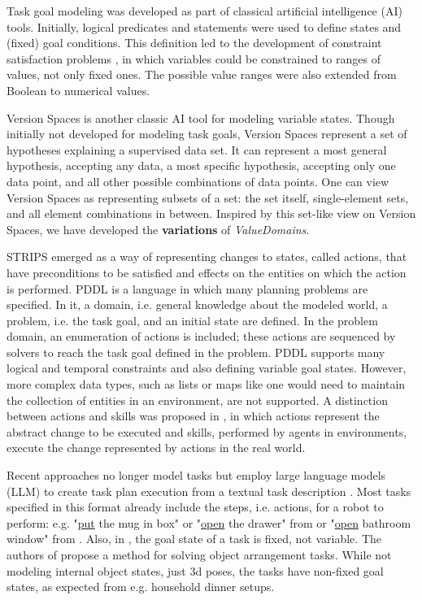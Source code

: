 Task goal modeling was developed as part of classical artificial intelligence (AI) tools. Initially, logical predicates and statements were used to define states and (fixed) goal conditions. This definition led to the development of constraint satisfaction problems \cite{ai_book_1}, in which variables could be constrained to ranges of values, not only fixed ones. The possible value ranges were also extended from Boolean to numerical values.

Version Spaces \cite{versionSpaceAlgebra} is another classic AI tool for modeling variable states. Though initially not developed for modeling task goals, Version Spaces represent a set of hypotheses explaining a supervised data set. It can represent a most general hypothesis, accepting any data, a most specific hypothesis, accepting only one data point, and all other possible combinations of data points. One can view Version Spaces as representing subsets of a set: the set itself, single-element sets, and all element combinations in between. Inspired by this set-like view on Version Spaces, we have developed the \textbf{variations} of \textit{ValueDomains}.

STRIPS \cite{strips} emerged as a way of representing changes to states, called actions, that have preconditions to be satisfied and effects on the entities on which the action is performed. PDDL \cite{pddl} is a language in which many planning problems are specified. In it, a domain, i.e. general knowledge about the modeled world, a problem, i.e. the task goal, and an initial state are defined. In the problem domain, an enumeration of actions is included; these actions are sequenced by solvers to reach the task goal defined in the problem. PDDL supports many logical and temporal constraints and also defining variable goal states. However, more complex data types, such as lists or maps like one would need to maintain the collection of entities in an environment, are not supported. A distinction between actions and skills was proposed in \cite{conceptHierarchyGeriatronicsSummit24}, in which actions represent the abstract change to be executed and skills, performed by agents in environments, execute the change represented by actions in the real world.

Recent approaches no longer model tasks but employ large language models (LLM) to create task plan execution from a textual task description \cite{taskModel_llm1, fltrnn, taskModel_llm2}. Most tasks specified in this format already include the steps, i.e. actions, for a robot to perform: e.g. "\underline{put} the mug in box" or "\underline{open} the drawer" from \cite{taskModel_llm1} or "\underline{open} bathroom window" from \cite{taskModel_llm2}. Also, in \cite{fltrnn}, the goal state of a task is fixed, not variable. The authors of \cite{task_onlyPose_withVariableGoal} propose a method for solving object arrangement tasks. While not modeling internal object states, just 3d poses, the tasks have non-fixed goal states, as expected from e.g. household dinner setups.

